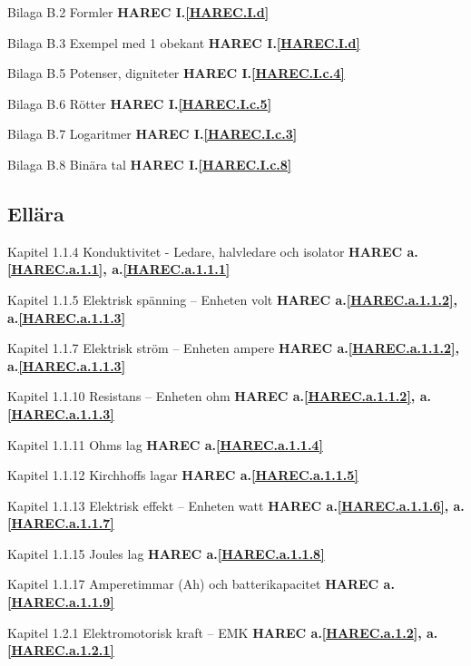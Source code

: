 \documentclass[a4paper,twoside,openright]{article}
\begin{document}
Bilaga B.2 Formler
\textbf{HAREC I.\ref{HAREC.I.d}\label{myHAREC.I.d.2a}}

Bilaga B.3 Exempel med 1 obekant
\textbf{HAREC I.\ref{HAREC.I.d}\label{myHAREC.I.d.2b}}

Bilaga B.5 Potenser, digniteter
\textbf{HAREC I.\ref{HAREC.I.c.4}\label{myHAREC.I.c.4}}

Bilaga B.6 Rötter
\textbf{HAREC I.\ref{HAREC.I.c.5}\label{myHAREC.I.c.5}}

Bilaga B.7 Logaritmer
\textbf{HAREC I.\ref{HAREC.I.c.3}\label{myHAREC.I.c.3}}

Bilaga B.8 Binära tal
\textbf{HAREC I.\ref{HAREC.I.c.8}\label{myHAREC.I.c.8}}

\subsection{Ellära}

Kapitel 1.1.4 Konduktivitet - Ledare, halvledare och isolator
\textbf{HAREC a.\ref{HAREC.a.1.1}\label{myHAREC.a.1.1}, a.\ref{HAREC.a.1.1.1}\label{myHAREC.a.1.1.1}}

Kapitel 1.1.5 Elektrisk spänning -- Enheten volt
\textbf{HAREC a.\ref{HAREC.a.1.1.2}\label{myHAREC.a.1.1.2b}, a.\ref{HAREC.a.1.1.3}\label{myHAREC.a.1.1.3b}}

Kapitel 1.1.7 Elektrisk ström -- Enheten ampere
\textbf{HAREC a.\ref{HAREC.a.1.1.2}\label{myHAREC.a.1.1.2a}, a.\ref{HAREC.a.1.1.3}\label{myHAREC.a.1.1.3a}}

Kapitel 1.1.10 Resistans -- Enheten ohm
\textbf{HAREC a.\ref{HAREC.a.1.1.2}\label{myHAREC.a.1.1.2c}, a.\ref{HAREC.a.1.1.3}\label{myHAREC.a.1.1.3c}}

Kapitel 1.1.11 Ohms lag
\textbf{HAREC a.\ref{HAREC.a.1.1.4}\label{myHAREC.a.1.1.4}}

Kapitel 1.1.12 Kirchhoffs lagar
\textbf{HAREC a.\ref{HAREC.a.1.1.5}\label{myHAREC.a.1.1.5}}

Kapitel 1.1.13 Elektrisk effekt -- Enheten watt
\textbf{HAREC a.\ref{HAREC.a.1.1.6}\label{myHAREC.a.1.1.6}, a.\ref{HAREC.a.1.1.7}\label{myHAREC.a.1.1.7}}

Kapitel 1.1.15 Joules lag
\textbf{HAREC a.\ref{HAREC.a.1.1.8}\label{myHAREC.a.1.1.8}}

Kapitel 1.1.17 Amperetimmar (Ah) och batterikapacitet
\textbf{HAREC a.\ref{HAREC.a.1.1.9}\label{myHAREC.a.1.1.9}}

Kapitel 1.2.1 Elektromotorisk kraft -- EMK
\textbf{HAREC a.\ref{HAREC.a.1.2}\label{myHAREC.a.1.2}, a.\ref{HAREC.a.1.2.1}\label{myHAREC.a.1.2.1}} 
\end{document}
